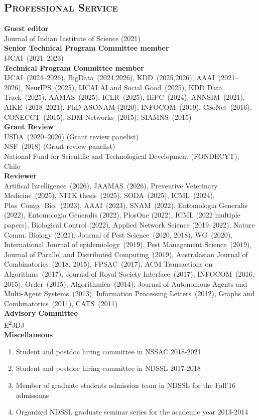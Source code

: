 \documentclass[margin,10pt]{res}
\begin{document}
\begin{resume}
\section{\textnormal{\textsc{Professional Service}}}
\noindent\textbf{Guest editor}\\
Journal of Indian Institute of Science (2021)
\smallskip\\
\noindent\textbf{Senior Technical Program Committee member}\\ 
IJCAI~(2021--2023)
\smallskip\\
\noindent\textbf{Technical Program Committee member}\\ 
IJCAI~(2024--2026), 
BigData~(2024,2026), KDD~(2025,2026), AAAI~(2021--2026), NeurIPS~(2025),
IJCAI AI and Social Good~(2025), KDD Data
Track~(2025), AAMAS~(2025), ICLR~(2025), HiPC~(2024),
ANNSIM~(2021), AIKE~(2018--2021), PhD-ASONAM (2020),
INFOCOM~(2019), CSoNet~(2016), CONECCT~(2015), SDM-Networks~(2015),
SIAMNS~(2015)\smallskip\\
\noindent\textbf{Grant Review}\\
USDA~(2020--2026) (Grant review panelist)\\
NSF~(2018) (Grant review panelist)\\
National Fund for Scientific and Technological Development (FONDECYT),
Chile\smallskip\\
\noindent\textbf{Reviewer}\\ 
\noindent
Artifical Intelligence~(2026),
JAAMAS~(2026),
Preventive Veterinary Medicine~(2025), 
NITK thesis~(2025),
SODA~(2025),
ICML~(2024),
Plos~Comp.~Bio.~(2023),
AAAI~(2023),
SNAM~(2022),
Entomologia Generalis (2022),
Entomologia Generalis (2022),
PlosOne (2022),
ICML (2022 multiple papers),
Biological Control (2022),
Applied Network Science (2019--2022),
Nature Comm. Biology (2021),
Journal of Pest Science~(2020, 2018), 
WG~(2020),
International Journal of epidemiology~(2019),
Pest Management Science~(2019), 
Journal of Parallel and Distributed Computing~(2019), 
Australasian Journal of Combinatorics~(2018, 2015),
FPSAC~(2017),
ACM Transactions on Algorithms~(2017),
Journal of Royal Society Interface~(2017), INFOCOM~(2016, 2015), Order~(2015), 
Algorithmica~(2014), Journal of Autonomous Agents and Multi-Agent
Systems~(2013), 
Information Processing Letters~(2012), 
Graphs and
Combinatorics~(2011), CATS~(2011)\smallskip\\
\noindent\textbf{Advisory Committee}\\
E\textsuperscript{2}JDJ\bigskip\\
\noindent\textbf{Miscellaneous}\\ 
\begin{enumerate}[$\circ$]
\item Student and postdoc hiring committee in NSSAC 2018-2021
\item Student and postdoc hiring committee in NDSSL 2017-2018
\item Member of graduate students admission team in NDSSL for the Fall'16
admissions
\item Organized NDSSL graduate seminar series for the academic year 2013-2014
\end{enumerate}
\end{resume}

\end{document}
